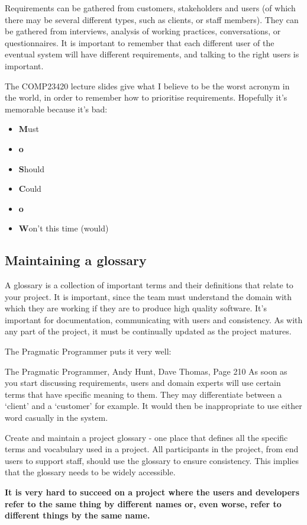 Requirements can be gathered from customers, stakeholders and users (of which
there may be several different types, such as clients, or staff members). They
can be gathered from interviews, analysis of working practices, conversations,
or questionnaires. It is important to remember that each different user of the
eventual system will have different requirements, and talking to the right users
is important.

The COMP23420 lecture slides give what I believe to be the worst acronym in the
world, in order to remember how to prioritise requirements. Hopefully it's
memorable because it's bad:

\begin{itemize}
  \item \textbf{M}ust
  \item \textbf{o}
  \item \textbf{S}hould
  \item \textbf{C}ould
  \item \textbf{o}
  \item \textbf{W}on't this time (would)
\end{itemize}

\subsection{Maintaining a glossary}

A glossary is a collection of important terms and their definitions that relate
to your project. It is important, since the team must understand the domain with
which they are working if they are to produce high quality software. It's
important for documentation, communicating with users and consistency. As with
any part of the project, it must be continually updated as the project matures.

The Pragmatic Programmer puts it very well:

\begin{aquote}{The Pragmatic Programmer, Andy Hunt, Dave Thomas, Page 210}
  As soon as you start discussing requirements, users and domain experts will
  use certain terms that have specific meaning to them. They may differentiate
  between a `client' and a `customer' for example. It would then be
  inappropriate to use either word casually in the system.

  Create and maintain a project glossary - one place that defines all the
  specific terms and vocabulary used in a project. All participants in the
  project, from end users to support staff, should use the glossary to ensure
  consistency. This implies that the glossary needs to be widely accessible.

    \textbf{It is very hard to succeed on a project where the users and
  developers refer to the same thing by different names or, even worse, refer to
  different things by the same name.}
\end{aquote}

